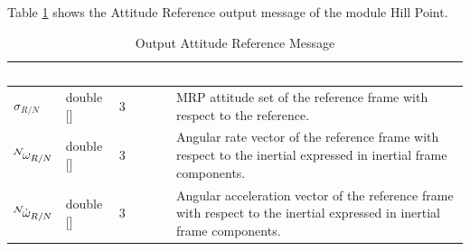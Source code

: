 \documentclass[]{AVSSimReportMemo}
\begin{document}
Table \ref{tab:outputTable} shows the Attitude Reference output message of the module Hill Point.
\begin{table}[h!]
	\centering
	\caption{Output Attitude Reference Message}
	\begin{tabular}{|l|l|l|p{3in}|}
		\hline
		\rowcolor{BrickRed}
		\textcolor{white}{Name} & \textcolor{white}{Type} & 
		\textcolor{white}{Length} & 
		\textcolor{white}{Description}  \\ \hline
		$\sigma_{R/N}$ & double [] & 3 & 
		MRP attitude set of the reference frame with respect to the reference. \\ \hline
		$\leftexp{N} \omega_{R/N}$ & double [] & 3 & 
		Angular rate vector of the reference frame with respect to the inertial expressed in inertial frame components. \\ \hline
		$\leftexp{N} {\dot{\omega}_{R/N}}$ & double [] & 3 & 
		Angular acceleration vector of the reference frame with respect to the inertial expressed in inertial frame components. \\ \hline
	\end{tabular}
	\label{tab:outputTable}
\end{table}
\newpage
\end{document}
